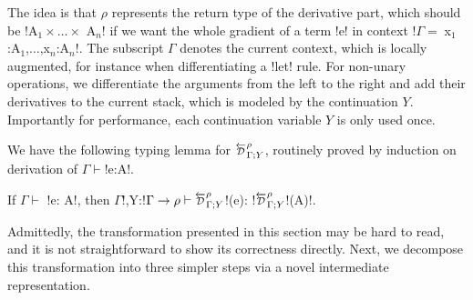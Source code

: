 The idea is that $\rho$ represents the return type of the derivative part, which should be !A$_{1} \times \ldots \times$ A$_n$! 
if we want the whole gradient of a term !e! in context !$\Gamma = \;$x$_{1}$:A$_{1}$,$\ldots$,x$_n$:A$_n$!.
The subscript $\Gamma$ denotes the current context, 
which is locally augmented, for instance when differentiating a !let! rule.
For non-unary operations, we differentiate the arguments from the left to the right and add their derivatives to the current stack, 
which is modeled by the continuation $Y$. 
Importantly for performance, each continuation variable $Y$ is only used once.

We have the following typing lemma for $\directD{\rho}{\Gamma}{Y}$, routinely proved by induction on derivation of $\Gamma\vdash$!e:A!.
\begin{lemma}
    If $\Gamma \vdash$ !e: A!, then $\Gamma$!,Y:!$\Gamma\to \rho \vdash \directD{\rho}{\Gamma}{Y}$!(e): !$\directD{\rho}{\Gamma}{Y}$!(A)!.
\end{lemma}



Admittedly, the transformation presented in this section may be hard to read, and it is not straightforward to show its correctness directly. 
Next, we decompose this transformation into three simpler steps via a novel intermediate representation.